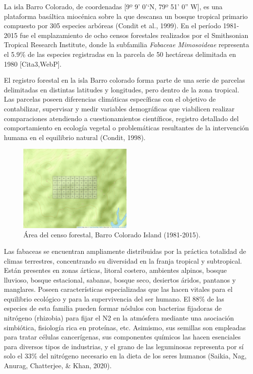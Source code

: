 \documentclass[11pt,]{article}
\begin{document}
La isla Barro Colorado, de coordenadas {[}9º 9' 0'`N, 79º 51' 0'' W{]},
es una plataforma basáltica miocénica sobre la que descansa un bosque
tropical primario compuesto por 305 especies arbóreas (Condit et al.,
1999). En el período 1981-2015 fue el emplazamiento de ocho censos
forestales realizados por el Smithsonian Tropical Research Institute,
donde la subfamilia \emph{Fabaceae Mimosoideae} representa el 5.9\% de
las especies registradas en la parcela de 50 hectáreas delimitada en
1980 {[}Cita3,WebP{]}.

El registro forestal en la isla Barro colorado forma parte de una serie
de parcelas delimitadas en distintas latitudes y longitudes, pero dentro
de la zona tropical. Las parcelas poseen diferencias climáticas
específicas con el objetivo de contabilizar, supervisar y medir
variables demográficas que viabilicen realizar comparaciones atendiendo
a cuestionamientos científicos, registro detallado del comportamiento en
ecología vegetal o problemáticas resultantes de la intervención humana
en el equilibrio natural (Condit, 1998).

\begin{figure}
\centering
\includegraphics[width=0.50000\textwidth]{mapa_cuadros.png}
\caption{Área del censo forestal, Barro Colorado Island (1981-2015).}
\end{figure}

Las fabaceas se encuentran ampliamente distribuidas por la práctica
totalidad de climas terrestres, concentrando su diversidad en la franja
tropical y subtropical. Están presentes en zonas árticas, litoral
costero, ambientes alpinos, bosque lluvioso, bosque estacional, sabanas,
bosque seco, desiertos áridos, pantanos y manglares. Poseen
características especializadas que las hacen vitales para el equilibrio
ecológico y para la supervivencia del ser humano. El 88\% de las
especies de esta familia pueden formar nódulos con bacterias fijadoras
de nitrógeno (rhizobia) para fijar el N2 en la atmósfera mediante una
asociación simbiótica, fisiología rica en proteínas, etc. Asimismo, sus
semillas son empleadas para tratar células cancerígenas, sus componentes
químicos las hacen esenciales para diversos tipos de industrias, y el
grano de las leguminosas representa por sí solo el 33\% del nitrógeno
necesario en la dieta de los seres humanos (Saikia, Nag, Anurag,
Chatterjee, \& Khan, 2020).
\end{document}
